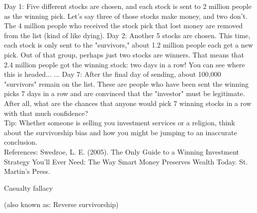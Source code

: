 \documentclass[a4paper,12pt,single,pdftex]{scrbook}
\begin{document}
    
      Day 1: Five different stocks are chosen, and each stock is sent to 2 million people as the winning pick. Let's say three of those stocks make money, and two don't. The 4 million people who received the stock pick that lost money are removed from the list (kind of like dying). \newline
 \newline
Day 2: Another 5 stocks are chosen. This time, each stock is only sent to the "survivors," about 1.2 million people each get a new pick. Out of that group, perhaps just two stocks are winners. That means that 2.4 million people got the winning stock: two days in a row! You can see where this is headed... \newline
 \newline
... \newline
 \newline
Day 7: After the final day of sending, about 100,000 "survivors" remain on the list. These are people who have been sent the winning picks 7 days in a row and are convinced that the "investor" must be legitimate. After all, what are the chances that anyone would pick 7 winning stocks in a row with that much confidence?
    \\

    
      Tip: Whether someone is selling you investment services or a religion, think about the survivorship bias and how you might be jumping to an inaccurate conclusion.
    \\

    References: Swedroe, L. E. (2005). The Only Guide to a Winning Investment Strategy You’ll Ever Need: The Way Smart Money Preserves Wealth Today. St. Martin’s Press.
  

Casualty fallacy
    
      (also known as: Reverse survivorship)
    \\
\end{document}
